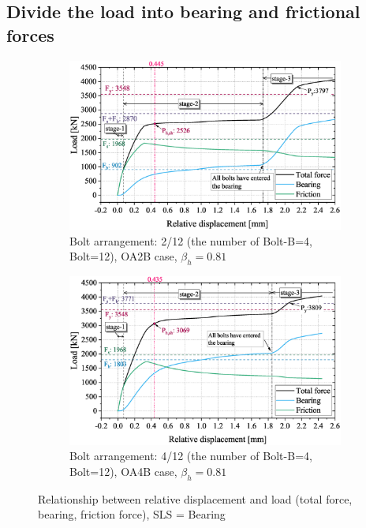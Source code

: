 \subsection{Divide the load into bearing and frictional forces}


\begin{figure}
\centering

\begin{subfigure}[b]{0.9\textwidth}
    \centering
    \includegraphics[width=\textwidth]{imgs/ch7/LD-OAP2B.eps}
    \caption{Bolt arrangement: 2/12 (the number of Bolt-B=4, Bolt=12), OA2B case, $\beta_h = 0.81$}
    \label{fig-ldoa2b}
\end{subfigure}
\hfill
\begin{subfigure}[b]{0.9\textwidth}
    \centering
    \includegraphics[width=\textwidth]{imgs/ch7/LD-OA4B.eps}
    \caption{Bolt arrangement: 4/12 (the number of Bolt-B=4, Bolt=12), OA4B case, $\beta_h = 0.81$}
    \label{fig-ldoa4b}
\end{subfigure}

\caption{Relationship between relative displacement and load (total force, bearing, friction force), SLS = Bearing}
\label{fig-loadrd-beaf}
\end{figure}

